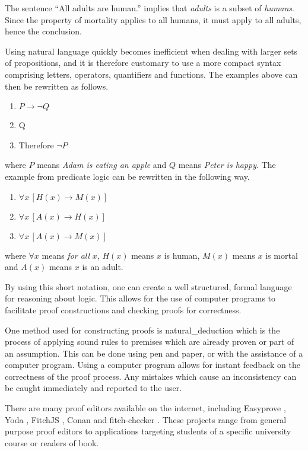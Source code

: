The sentence ``All adults are human.'' implies that \textit{adults} is a subset of \textit{humans}. Since the property of mortality applies to all humans, it must apply to all adults, hence the conclusion.

Using natural language quickly becomes inefficient when dealing with larger sets of propositions, and it is therefore customary to use a more compact syntax comprising letters, operators, quantifiers and functions. The examples above can then be rewritten as follows.

\begin{enumerate}
      \item $P \rightarrow \lnot Q$
      \item Q
      \item Therefore $\lnot P$
\end{enumerate}

where $P$ means \textit{Adam is eating an apple} and $Q$ means \textit{Peter is happy}. The example from predicate logic can be rewritten in the following way.

\begin{enumerate}[resume]
      \item $\forall x \, [H(x) \rightarrow M(x)]$
      \item $\forall x \, [A(x) \rightarrow H(x)]$
      \item $\forall x \, [A(x) \rightarrow M(x)]$
\end{enumerate}

where $\forall x$ means \textit{for all} $x$, $H(x)$ means $x$ is human, $M(x)$ means $x$ is mortal and $A(x)$ means $x$ is an adult.

By using this short notation, one can create a well structured, formal language for reasoning about logic. This allows for the use of computer programs to facilitate proof constructions and checking proofs for correctness.

One method used for constructing proofs is \gls{natural_deduction} which is the process of applying sound rules to premises which are already proven or part of an assumption. \cite{huth_ryan_2018} This can be done using pen and paper, or with the assistance of a computer program. Using a computer program allows for instant feedback on the correctness of the proof process. Any mistakes which cause an inconsistency can be caught immediately and reported to the user.

There are many proof editors available on the internet, including Easyprove \cite{easyprove}, Yoda \cite{Yoda}, FitchJS \cite{rieppel}, Conan \cite{conan} and fitch-checker \cite{klement}. These projects range from general purpose proof editors to applications targeting students of a specific university course or readers of book.